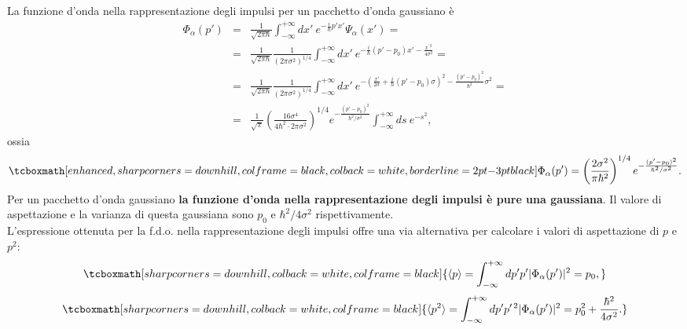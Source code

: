 La funzione d'onda nella rappresentazione degli impulsi per un pacchetto d'onda gaussiano è
	\begin{eqnarray}
		\Phi_\alpha(p') &=& \frac{1}{\sqrt{2 \pi \hbar}} \int_{-\infty}^{+\infty} dx'~ e^{-\frac{i}{\hbar} p' x'} \Psi_\alpha(x') = \nonumber \\
		&=& \frac{1}{\sqrt{2 \pi \hbar}} \frac{1}{(2 \pi \sigma^2)^{1/4}} \int_{-\infty}^{+\infty} dx'~ e^{-\frac{i}{\hbar} (p'-p_0) x' - \frac{x^{\prime \, 2}}{4 \sigma^2}} = \nonumber \\
		&=& \frac{1}{\sqrt{2 \pi \hbar}} \frac{1}{(2 \pi \sigma^2)^{1/4}} \int_{-\infty}^{+\infty} dx'~ e^{-\left(\frac{x'}{2 \sigma} + \frac{i}{\hbar} (p'-p_0) \sigma \right)^2 - \frac{(p'-p_0)^2}{\hbar^2}\sigma^2} = \nonumber \\
		&=&  \frac{1}{\sqrt{\pi}} \left(\frac{16 \sigma^4}{4 \hbar^2 \cdot 2 \pi \sigma^2} \right)^{1/4} e^{-\frac{(p'-p_0)^2}{\hbar^2/\sigma^2}} \int_{-\infty}^{+\infty} ds ~e^{-s^2},
	\end{eqnarray}
ossia
	\begin{equation}
		\tcboxmath[enhanced, sharp corners=downhill, colframe=black, colback=white, borderline={2pt}{-3pt}{black}]{
			\Phi_\alpha(p') = \left(\frac{2 \sigma^2}{\pi \hbar^2} \right)^{1/4} e^{-\frac{(p'-p_0)^2}{\hbar^2/\sigma^2}}.
			}
	\end{equation}
Per un pacchetto d'onda gaussiano \textbf{la funzione d'onda nella rappresentazione degli impulsi è pure una gaussiana}. Il valore di aspettazione e la varianza di questa gaussiana sono $p_0$ e $\hbar^2/4 \sigma^2$ rispettivamente.\\

L'espressione ottenuta per la f.d.o. nella rappresentazione degli impulsi offre una via alternativa per calcolare i valori di aspettazione di $p$ e $p^2$:
	\begin{equation}
		\tcboxmath[sharp corners=downhill, colback=white, colframe=black]{
		\langle p \rangle = \int_{-\infty}^{+\infty} dp' p' |\Phi_\alpha(p')|^2 = p_0,
			}
	\end{equation}
	\begin{equation}
		\tcboxmath[sharp corners=downhill, colback=white, colframe=black]{
		\langle p^2 \rangle = \int_{-\infty}^{+\infty} dp' p^{\prime \, 2} |\Phi_\alpha(p')|^2 = p_0^2 + \frac{\hbar^2}{4 \sigma^2}.
			}
	\end{equation}

